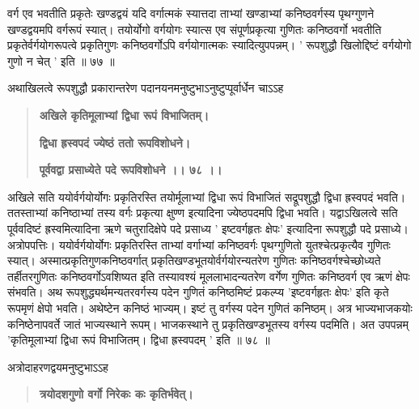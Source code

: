\documentclass[11pt, openany]{book}
\begin{document}
\begin{sloppypar}
\hangindent=0.2in वर्ग एव भवतीति प्रकृतेः खण्डद्वयं यदि वर्गात्मकं स्यात्तदा ताभ्यां खण्डाभ्यां कनिष्ठवर्गस्य पृथग्गुणने खण्डद्वयमपि वर्गरूपं स्यात्। तयोर्योगो वर्गयोगः स्यात्स एव संपूर्णप्रकृत्या गुणितः कनिष्ठवर्गो भवतीति प्रकृतेर्वर्गयोगरूपत्वे प्रकृतिगुणः कनिष्ठवर्गोऽपि वर्गयोगात्मकः स्यादित्युपपन्नम्। ' रूपशुद्धौ खिलोद्दिष्टं वर्गयोगो गुणो न चेत् ' इति ॥ ७७ ॥

\hangindent=0.2in \hspace{0.2in}अथाखिलत्वे रूपशुद्धौ प्रकारान्तरेण पदानयनमनुष्टुभाऽनुष्टुप्पूर्वार्धेन चाऽऽह\textendash

\begin{quote}

\hspace{0.5in}\textbf{अखिले कृतिमूलाभ्यां द्विधा रूपं विभाजितम्।}

\hspace{0.5in}\textbf{द्विधा ह्रस्वपदं ज्येष्ठं ततो रूपविशोधने।}

\hspace{0.5in}\textbf{पूर्ववद्वा प्रसाध्येते पदे रूपविशोधने ।। ७८ ।।}
\end{quote}

\hangindent=0.2in \hspace{0.2in}अखिले सति ययोर्वर्गयोर्योगः प्रकृतिरस्ति तयोर्मूलाभ्यां द्विधा रूपं विभाजितं सद्रूपशुद्धौ द्विधा ह्रस्वपदं भवति। ततस्ताभ्यां कनिष्ठाभ्यां तस्य वर्गः प्रकृत्या क्षुण्ण इत्यादिना ज्येष्ठपदमपि द्विधा भवति। यद्वाऽखिलत्वे सति पूर्ववदिष्टं ह्रस्वमित्यादिना ऋणे चतुरादिक्षेपे पदे प्रसाध्य ' इष्टवर्गहृतः क्षेपः' इत्यादिना रूपशुद्धौ पदे प्रसाध्ये। अत्रोपपत्तिः। ययोर्वर्गयोर्योगः प्रकृतिरस्ति ताभ्यां वर्गाभ्यां कनिष्ठवर्गः पृथग्गुणितो युतश्चेत्प्रकृत्यैव गुणितः स्यात्। अस्मात्प्रकृतिगुणकनिष्ठवर्गात् प्रकृतिखण्डभूतयोर्वर्गयोरन्यतरेण गुणितः कनिष्ठवर्गश्चेच्छोध्यते तर्हीतरगुणितः कनिष्ठवर्गोऽवशिष्यत इति तस्यावश्यं मूललाभादन्यतरेण वर्गेण गुणितः कनिष्ठवर्ग एव ऋणं क्षेपः संभवति। अथ रूपशुद्ध्यर्थमन्यतरवर्गस्य पदेन गुणितं कनिष्ठमिष्टं प्रकल्प्य 'इष्टवर्गहृतः क्षेपः' इति कृते रूपमृणं क्षेपो भवति। अथेष्टेन कनिष्ठं भाज्यम्। इष्टं तु वर्गस्य पदेन गुणितं कनिष्ठम्। अत्र भाज्यभाजकयोः कनिष्ठेनापवर्ते जातं भाज्यस्थाने रूपम्। भाजकस्थाने तु प्रकृतिखण्डभूतस्य वर्गस्य पदमिति। अत उपपन्नम् 'कृतिमूलाभ्यां द्विधा रूपं विभाजितम्। द्विधा ह्रस्वपदम् ' इति ॥ ७८ ॥

\hangindent=0.2in \hspace{0.2in}अत्रोदाहरणद्वयमनुष्टुभाऽऽह\textendash

\begin{quote}
\hspace{0.5in}\textbf{त्रयोदशगुणो वर्गो निरेकः कः कृतिर्भवेत्।}


\end{quote}
\end{sloppypar}
\end{document}
